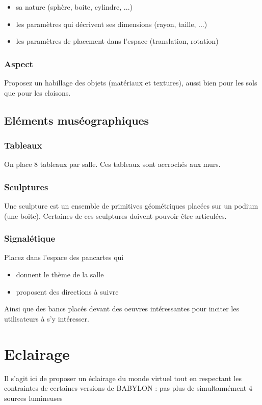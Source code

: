 \documentclass[10pt,a4paper]{article}
\begin{document}
    \begin{itemize}
    	\item sa nature (sphère, boite, cylindre, ...)
    	\item les paramètres qui décrivent ses dimensions (rayon, taille, ...)
    	\item les paramètres de placement dans l'espace (translation, rotation)
    \end{itemize}
    
    \subsubsection{Aspect}
    Proposez un habillage des objets (matériaux et textures), aussi bien pour les sols que pour les cloisons.
    

    \subsection{Eléments muséographiques}
    
   
    
    \subsubsection{Tableaux}
    On place 8 tableaux par salle. Ces tableaux sont accrochés aux murs.
    \subsubsection{Sculptures}
    Une sculpture est un ensemble de primitives géométriques placées sur un podium (une boite). Certaines de ces sculptures doivent pouvoir être articulées.
    
    \subsubsection{Signalétique}
    Placez dans l'espace des pancartes qui 
    \begin{itemize}
    	\item donnent le thème de la salle
    	\item proposent des directions à suivre
    \end{itemize}
    Ainsi que des bancs placés devant des oeuvres intéressantes pour inciter les utilisateurs à s'y intéresser.
	
	\section{Eclairage}
	Il s'agit ici de proposer un éclairage du monde virtuel tout en respectant les contraintes de certaines versions de BABYLON : pas plus de simultannément  4 sources lumineuses 
	
\end{document}
